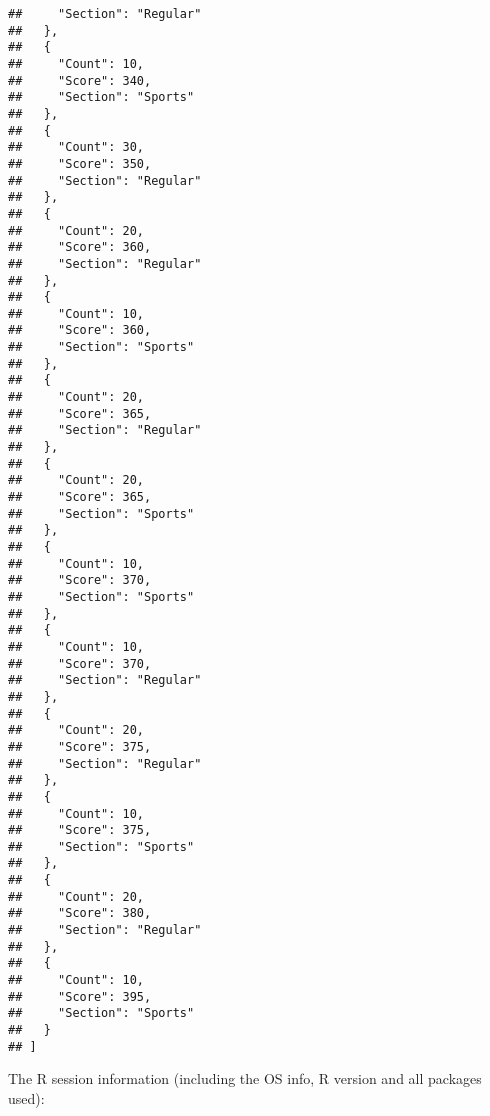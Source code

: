 \documentclass{article}\usepackage[]{graphicx}\usepackage[]{xcolor}
\makeatletter
\newenvironment{kframe}{%
 \def\at@end@of@kframe{}%
 \ifinner\ifhmode%
  \def\at@end@of@kframe{\end{minipage}}%
  \begin{minipage}{\columnwidth}%
 \fi\fi%
 \def\FrameCommand##1{\hskip\@totalleftmargin \hskip-\fboxsep
 \colorbox{shadecolor}{##1}\hskip-\fboxsep
     \hskip-\linewidth \hskip-\@totalleftmargin \hskip\columnwidth}%
 \MakeFramed {\advance\hsize-\width
   \@totalleftmargin\z@ \linewidth\hsize
   \@setminipage}}%
 {\par\unskip\endMakeFramed%
 \at@end@of@kframe}
\newenvironment{knitrout}{}{} %
\makeatother
\begin{document}
\begin{knitrout}
\begin{kframe}
\begin{verbatim}
##     "Section": "Regular"
##   },
##   {
##     "Count": 10,
##     "Score": 340,
##     "Section": "Sports"
##   },
##   {
##     "Count": 30,
##     "Score": 350,
##     "Section": "Regular"
##   },
##   {
##     "Count": 20,
##     "Score": 360,
##     "Section": "Regular"
##   },
##   {
##     "Count": 10,
##     "Score": 360,
##     "Section": "Sports"
##   },
##   {
##     "Count": 20,
##     "Score": 365,
##     "Section": "Regular"
##   },
##   {
##     "Count": 20,
##     "Score": 365,
##     "Section": "Sports"
##   },
##   {
##     "Count": 10,
##     "Score": 370,
##     "Section": "Sports"
##   },
##   {
##     "Count": 10,
##     "Score": 370,
##     "Section": "Regular"
##   },
##   {
##     "Count": 20,
##     "Score": 375,
##     "Section": "Regular"
##   },
##   {
##     "Count": 10,
##     "Score": 375,
##     "Section": "Sports"
##   },
##   {
##     "Count": 20,
##     "Score": 380,
##     "Section": "Regular"
##   },
##   {
##     "Count": 10,
##     "Score": 395,
##     "Section": "Sports"
##   }
## ]
\end{verbatim}
\end{kframe}
\end{knitrout}

The R session information (including the OS info, R version and all
packages used):
\end{document}
